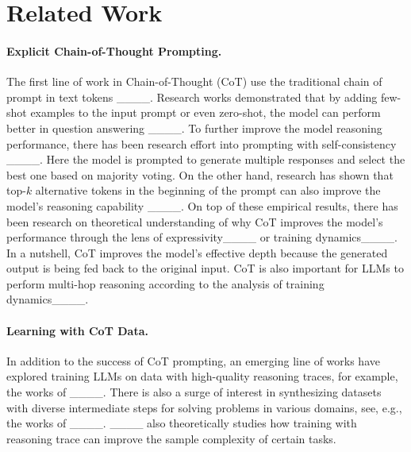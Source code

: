 \section{Related Work}
\label{sec:related}

\paragraph{Explicit Chain-of-Thought Prompting.} The first line of work in Chain-of-Thought (CoT) use the traditional chain of prompt in text tokens ____.  Research works demonstrated that by adding few-shot examples to the input prompt or even zero-shot, the model can perform better in question answering ____.
To further improve the model reasoning performance, there has been research effort into prompting with self-consistency ____. Here the model is prompted to generate multiple responses and select the best one based on majority voting. On the other hand, research has shown that top-$k$ alternative tokens in the beginning of the prompt can also improve the model's reasoning capability ____. 
On top of these empirical results, there has been research on theoretical understanding of why CoT improves the model's performance through the lens of expressivity____ or training dynamics____. In a nutshell, CoT improves the model's effective depth because the generated output is being fed back to the original input. CoT is also important for LLMs to perform multi-hop reasoning according to the analysis of training dynamics____.





   

\paragraph{Learning with CoT Data.} In addition to the success of CoT prompting,
an emerging line of works have explored training LLMs on data with high-quality reasoning traces, for example, the works of ____.
There is also a surge of interest in synthesizing datasets with diverse intermediate steps for solving problems in various domains, see, e.g.,  
the works of ____. ____ also theoretically studies how training with reasoning trace can improve the sample complexity of certain tasks.




